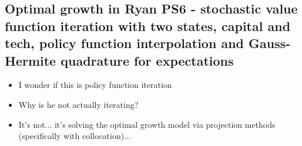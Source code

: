 \documentclass[11pt]{article}
\renewcommand{\[}{\begin{equation}}
\renewcommand{\]}{\end{equation}}
\DeclareMathOperator{\E}{\mathbb{E}}
\begin{document}
\subsection{Optimal growth in Ryan PS6 - stochastic value function iteration with two states, capital and tech, policy function interpolation and Gauss-Hermite quadrature for expectations}
\begin{itemize}
\item I wonder if this is policy function iteration
\item Why is he not actually iterating?
\item It's not... it's solving the optimal growth model via projection methods (specifically with collocation)...
\end{itemize}


%
%
%
%
\end{document}
